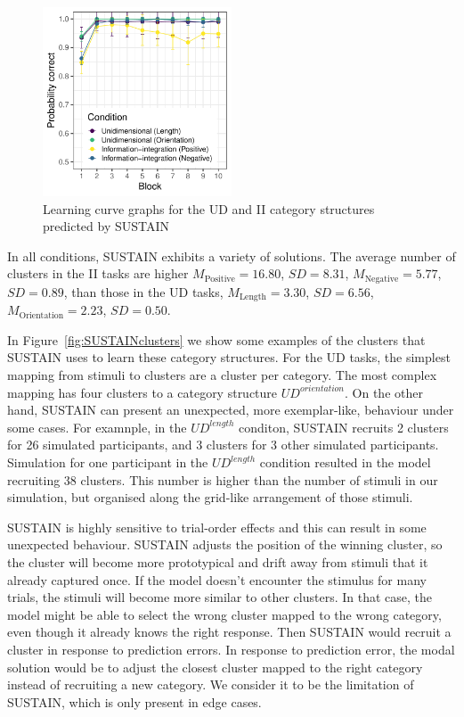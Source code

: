 \documentclass[12pt]{article}
\begin{document}
\begin{figure}
	\centering
	\includegraphics[width=0.5\textwidth]{Images/pu037learningCurveSUSTAIN}	
	\caption{Learning curve graphs for the UD and II category structures predicted by SUSTAIN}
	\label{fig:SUSTAINlearningCurveGraph}
\end{figure}

In all conditions, SUSTAIN exhibits a variety of solutions. The average 
number of clusters in the II tasks are higher
$M_\text{Positive}=16.80$, $SD=8.31$, $M_\text{Negative}=5.77$, $SD=0.89$,
than those in the UD tasks, $M_\text{Length}=3.30$, $SD=6.56$, $M_\text{Orientation}=2.23$, $SD=0.50$.

In Figure~\ref{fig:SUSTAINclusters} we show some examples of the clusters that SUSTAIN uses to learn these category structures. 
For the UD tasks, the simplest mapping from stimuli to clusters are a cluster per category. 
The most complex mapping has four clusters to a category structure $UD^{orientation}$. 
On the other hand, SUSTAIN can present an unexpected, more exemplar-like, behaviour 
under some cases. For examnple, in the $UD^{length}$ conditon, SUSTAIN recruits 
2 clusters for 26 simulated participants, and 3 clusters for 3 other simulated participants.
Simulation for one participant in the $UD^{length}$ condition resulted in the model recruiting
38 clusters. This number is higher than the number of stimuli in our simulation,
but organised along the grid-like arrangement of those stimuli. 

SUSTAIN is highly sensitive to trial-order effects \cite{Love2004} and this can result in
some unexpected behaviour. SUSTAIN adjusts the position of the winning cluster, so the 
cluster will become more prototypical and drift away from stimuli that it already captured 
once. If the model doesn't encounter the stimulus for many trials, the stimuli will become
more similar to other clusters. In that case, the model might be able to select the
wrong cluster mapped to the wrong category, even though it already knows the right response.
Then SUSTAIN would recruit a cluster in response to prediction errors. In response to prediction
error, the modal solution would be to adjust the closest cluster mapped to the right category
instead of recruiting a new category. We consider it to be the limitation of SUSTAIN, which
is only present in edge cases.
\end{document}
